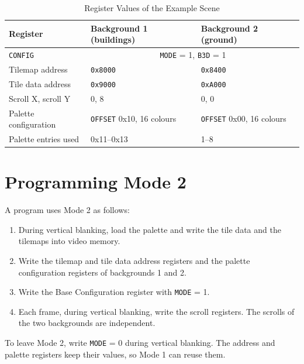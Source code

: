 \begin{table}[H]
	\centering
	\begin{tabular}{lll}
		\toprule
		\textbf{Register}     & \textbf{Background 1 (buildings)}                       & \textbf{Background 2 (ground)}   \\
		\midrule
		\texttt{CONFIG}       & \multicolumn{2}{c}{\texttt{MODE} = 1, \texttt{B3D} = 1}                                    \\
		Tilemap address       & \texttt{0x8000}                                         & \texttt{0x8400}                  \\
		Tile data address     & \texttt{0x9000}                                         & \texttt{0xA000}                  \\
		Scroll X, scroll Y    & 0, 8                                                    & 0, 0                             \\
		Palette configuration & \texttt{OFFSET} 0x10, 16 colours                        & \texttt{OFFSET} 0x00, 16 colours \\
		Palette entries used  & 0x11--0x13                                              & 1--8                             \\
		\bottomrule
	\end{tabular}
	\caption{Register Values of the Example Scene}
	\label{tab:m2-example-regs}
\end{table}

\section{Programming Mode 2}

A program uses Mode 2 as follows:

\begin{enumerate}
	\item During vertical blanking, load the palette and write the tile data and the tilemaps into video memory.
	\item Write the tilemap and tile data address registers and the palette configuration registers of backgrounds 1 and 2.
	\item Write the Base Configuration register with \texttt{MODE} = 1.
	\item Each frame, during vertical blanking, write the scroll registers. The scrolls of the two backgrounds are independent.
\end{enumerate}

To leave Mode 2, write \texttt{MODE} = 0 during vertical blanking. The address and palette registers keep their values,
so Mode 1 can reuse them.
